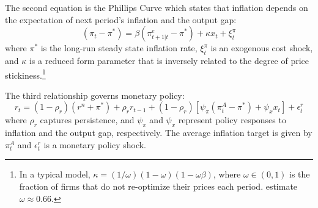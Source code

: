 \documentclass[english,authoryear,12pt]{elsarticle}
\begin{document}
The second equation is the Phillips Curve which states that inflation depends on the expectation of next period's inflation and the output gap:
\begin{equation}\label{eq:PhillipsCurvee}
	(\pi_t - \pi^*) = \beta (\pi_{t+1|t}^e - \pi^*) + \kappa x_t + \xi_t^{\pi}
\end{equation}
where $\pi^*$ is the long-run steady state inflation rate, $\xi_t^\pi$ is an exogenous cost shock, and $\kappa$ is a reduced form parameter that is inversely related to the degree of price stickiness.\footnote{In a typical model, $\kappa=(1/\omega)(1-\omega)(1-\omega\beta)$, where $\omega \in (0,1)$ is the fraction of firms that do not re-optimize their prices each period. \citet{smetswouters2007} estimate $\omega \approx 0.66$.}

The third relationship governs monetary policy:
\begin{equation}\label{eq:TaylorRule}
	r_t = (1-\rho_r)(r^n + \pi^*) + \rho_r r_{t-1} + (1-\rho_r) \left[ \psi_\pi (\pi_t^A - \pi^*) + \psi_x x_t \right] + \epsilon_t^{r}
\end{equation}
where $\rho_r$ captures persistence, and $\psi_\pi$ and $\psi_x$ represent policy responses to inflation and the output gap, respectively. The average inflation target is given by $\pi_t^A$ and $\epsilon_t^r$ is a monetary policy shock.
\end{document}
